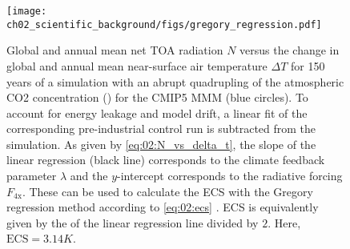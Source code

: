 \begin{figure}[t]
  \centering
  \texttt{[image: 
    ch02\_scientific\_background/figs/gregory\_regression.pdf]}
  \caption{Global and annual mean net \acf{TOA} radiation $N$ versus the change
    in global and annual mean near-surface air temperature $\Delta T$ for 150
    years of a simulation with an abrupt quadrupling of the atmospheric
    \acs{CO2} concentration () for the \acs{CMIP}5 \acl{MMM} (blue
    circles). To account for energy leakage and model drift, a linear fit of
    the corresponding pre-industrial control run is subtracted from the
     simulation. As given by \cref{eq:02:N_vs_delta_t}, the slope
    of the linear regression (black line) corresponds to the climate feedback
    parameter $\lambda$ and the $y$-intercept corresponds to the radiative
    forcing $F_\text{4x}$. These can be used to calculate the \acf{ECS} with
    the Gregory regression method according to \cref{eq:02:ecs}
    \autocite{Gregory2004}. \acs{ECS} is equivalently given by the
    \xintercept{} of the linear regression line divided by $2$. Here,
    $\text{ECS} = 3.14 \unit{K}$.}
  \label{fig:02:gregory_regression}
\end{figure}

